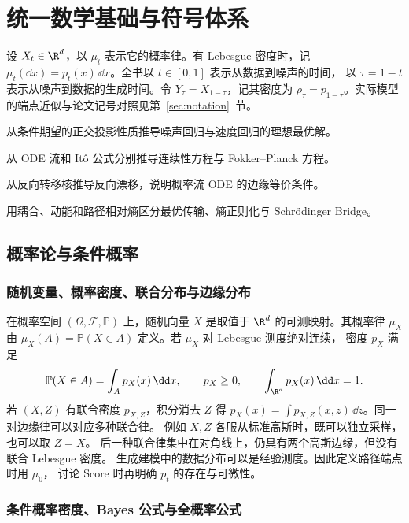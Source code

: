 \chapter{统一数学基础与符号体系}

设 \(X_t\in\R^d\)，以 \(\mu_t\) 表示它的概率律。有 Lebesgue 密度时，记
\(\mu_t(\dd x)=p_t(x)\,\dd x\)。全书以 \(t\in[0,1]\) 表示从数据到噪声的时间，
以 \(\tau=1-t\) 表示从噪声到数据的生成时间。令 \(Y_\tau=X_{1-\tau}\)，记其密度为
\(\rho_\tau=p_{1-\tau}\)。实际模型的端点近似与论文记号对照见第~\ref{sec:notation}~节。

\begin{learningobjectives}
  \item 从条件期望的正交投影性质推导噪声回归与速度回归的理想最优解。
  \item 从 ODE 流和 Itô 公式分别推导连续性方程与 Fokker--Planck 方程。
  \item 从反向转移核推导反向漂移，说明概率流 ODE 的边缘等价条件。
  \item 用耦合、动能和路径相对熵区分最优传输、熵正则化与 Schrödinger Bridge。
\end{learningobjectives}

\section{概率论与条件概率}

\subsection{随机变量、概率密度、联合分布与边缘分布}

在概率空间 \((\Omega,\mathcal F,\mathbb P)\) 上，随机向量 \(X\) 是取值于
\(\R^d\) 的可测映射。其概率律 \(\mu_X\) 由
\(\mu_X(A)=\mathbb P(X\in A)\) 定义。若 \(\mu_X\) 对 Lebesgue 测度绝对连续，
密度 \(p_X\) 满足
\[
  \mathbb P(X\in A)=\int_A p_X(x)\,\dd x,\qquad
  p_X\ge 0,\qquad \int_{\R^d} p_X(x)\,\dd x=1.
\]
若 \((X,Z)\) 有联合密度 \(p_{X,Z}\)，积分消去 \(Z\) 得
\(p_X(x)=\int p_{X,Z}(x,z)\,\dd z\)。同一对边缘律可以对应多种联合律。
例如 \(X,Z\) 各服从标准高斯时，既可以独立采样，也可以取 \(Z=X\)。
后一种联合律集中在对角线上，仍具有两个高斯边缘，但没有联合 Lebesgue 密度。
生成建模中的数据分布可以是经验测度。因此定义路径端点时用 \(\mu_0\)，
讨论 Score 时再明确 \(p_t\) 的存在与可微性。

\subsection{条件概率密度、Bayes 公式与全概率公式}

